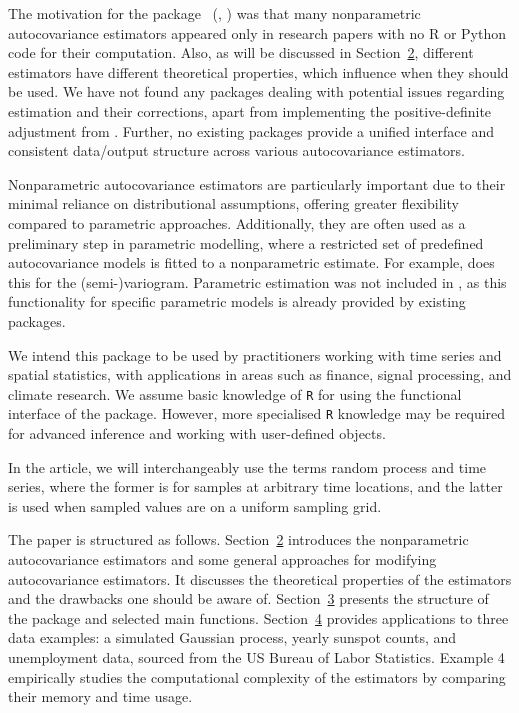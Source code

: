 The motivation for the package
~(\citeauthor{CovEsts_2025}, \citeyear{CovEsts_2025})
was that many nonparametric autocovariance estimators appeared only in
research papers with no R or Python code for their computation. Also, as
will be discussed in Section~\hyperref[sec:nonparametric]{2}, different
estimators have different theoretical properties, which influence when
they should be used. We have not found any packages dealing with
potential issues regarding estimation and their corrections, apart from
 \citep{ncf} implementing the positive-definite adjustment
from \cite{hall1994_2}. Further, no existing packages provide a unified
interface and consistent data/output structure across various
autocovariance estimators.

Nonparametric autocovariance estimators are particularly important due
to their minimal reliance on distributional assumptions, offering
greater flexibility compared to parametric approaches. Additionally,
they are often used as a preliminary step in parametric modelling, where
a restricted set of predefined autocovariance models is fitted to a
nonparametric estimate. For example,  \citep{gstat2016}
does this for the (semi-)variogram. Parametric estimation was not
included in , as this functionality for specific
parametric models is already provided by existing packages.

We intend this package to be used by practitioners working with time
series and spatial statistics, with applications in areas such as
finance, signal processing, and climate research. We assume basic
knowledge of \texttt{R} for using the functional interface of the
package. However, more specialised \texttt{R} knowledge may be required
for advanced inference and working with user-defined objects.

In the article, we will interchangeably use the terms random process and
time series, where the former is for samples at arbitrary time
locations, and the latter is used when sampled values are on a uniform
sampling grid.

The paper is structured as follows.
Section~\hyperref[sec:nonparametric]{2} introduces the nonparametric
autocovariance estimators and some general approaches for modifying
autocovariance estimators. It discusses the theoretical properties of
the estimators and the drawbacks one should be aware of.
Section~\hyperref[sec:overview]{3} presents the structure of the package
and selected main functions. Section~\hyperref[sec:examples]{4} provides
applications to three data examples: a simulated Gaussian process,
yearly sunspot counts, and unemployment data, sourced from the US Bureau
of Labor Statistics. Example 4 empirically studies the computational
complexity of the estimators by comparing their memory and time usage.

